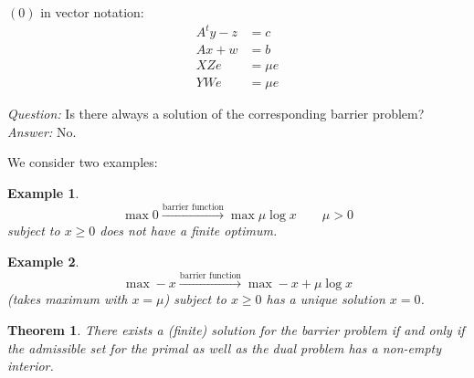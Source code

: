 \documentclass[a4paper]{article}
\newcounter{lecref}[subsection]
\numberwithin{lecref}{subsection}
\newtheorem{theorem}[lecref]{Theorem}
\newtheorem*{Example}{Example}
\begin{document}
$(0)$ in vector notation:
\begin{align*}
	A^t y - z &= c \\
	Ax + w &= b \\
	XZ e &= \mu e \\
	YW e &= \mu e
\end{align*}

\emph{Question:} Is there always a solution of the corresponding barrier problem? \\
\emph{Answer:} No.

We consider two examples:
\begin{Example}
	\[ \max 0 \xrightarrow{\text{barrier function}} \max \mu \log x \qquad \mu > 0 \]
	subject to $x \geq 0$ does not have a finite optimum.
\end{Example}
\begin{Example}
	\[ \max -x \xrightarrow{\text{barrier function}} \max -x + \mu \log x \]
	(takes maximum with $x = \mu$) subject to $x \geq 0$ has a unique solution $x = 0$.
\end{Example}

\begin{theorem}
	\label{theorem:5.1}
	There exists a (finite) solution for the barrier problem if and only if the admissible set for the primal as well as the dual problem has a non-empty interior.
\end{theorem}
\end{document}
